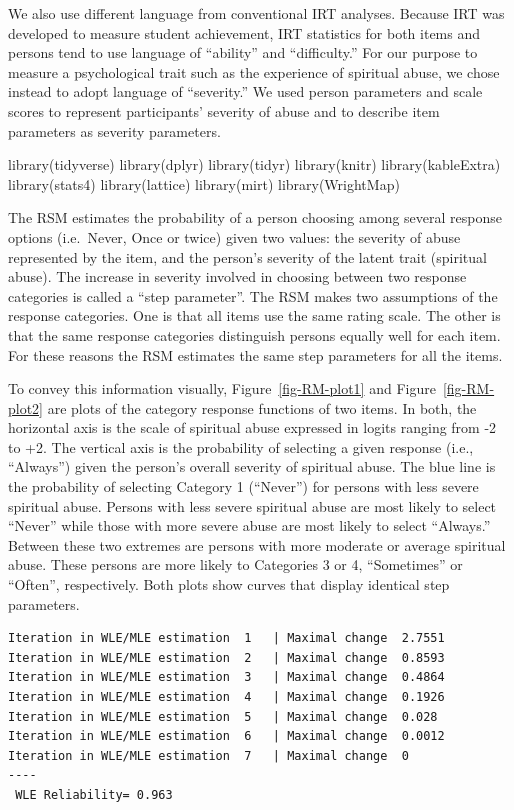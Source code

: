 \documentclass[
  letterpaper,
  DIV=11,
  numbers=noendperiod]{scrreport}
\begin{document}
We also use different language from conventional IRT analyses. Because
IRT was developed to measure student achievement, IRT statistics for
both items and persons tend to use language of ``ability'' and
``difficulty.'' For our purpose to measure a psychological trait such as
the experience of spiritual abuse, we chose instead to adopt language of
``severity.'' We used person parameters and scale scores to represent
participants' severity of abuse and to describe item parameters as
severity parameters.

library(tidyverse) library(dplyr) library(tidyr) library(knitr)
library(kableExtra) library(stats4) library(lattice) library(mirt)
library(WrightMap)

The RSM estimates the probability of a person choosing among several
response options (i.e.~Never, Once or twice) given two values: the
severity of abuse represented by the item, and the person's severity of
the latent trait (spiritual abuse). The increase in severity involved in
choosing between two response categories is called a ``step parameter''.
The RSM makes two assumptions of the response categories. One is that
all items use the same rating scale. The other is that the same response
categories distinguish persons equally well for each item. For these
reasons the RSM estimates the same step parameters for all the items.

To convey this information visually, Figure~\ref{fig-RM-plot1} and
Figure~\ref{fig-RM-plot2} are plots of the category response functions
of two items. In both, the horizontal axis is the scale of spiritual
abuse expressed in logits ranging from -2 to +2. The vertical axis is
the probability of selecting a given response (i.e., ``Always'') given
the person's overall severity of spiritual abuse. The blue line is the
probability of selecting Category 1 (``Never'') for persons with less
severe spiritual abuse. Persons with less severe spiritual abuse are
most likely to select ``Never'' while those with more severe abuse are
most likely to select ``Always.'' Between these two extremes are persons
with more moderate or average spiritual abuse. These persons are more
likely to Categories 3 or 4, ``Sometimes'' or ``Often'', respectively.
Both plots show curves that display identical step parameters.

\begin{verbatim}
Iteration in WLE/MLE estimation  1   | Maximal change  2.7551 
Iteration in WLE/MLE estimation  2   | Maximal change  0.8593 
Iteration in WLE/MLE estimation  3   | Maximal change  0.4864 
Iteration in WLE/MLE estimation  4   | Maximal change  0.1926 
Iteration in WLE/MLE estimation  5   | Maximal change  0.028 
Iteration in WLE/MLE estimation  6   | Maximal change  0.0012 
Iteration in WLE/MLE estimation  7   | Maximal change  0 
----
 WLE Reliability= 0.963 
\end{verbatim}
\end{document}

